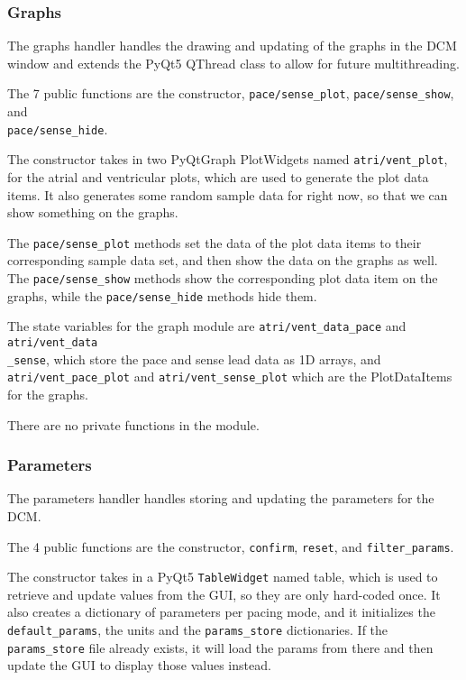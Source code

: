 \documentclass[12pt]{article}
\begin{document}
\subsubsection{Graphs}
The graphs handler handles the drawing and updating of the graphs in the DCM window and extends the PyQt5 QThread class to allow for future multithreading.

The 7 public functions are the constructor, \verb|pace/sense_plot|, \verb|pace/sense_show|, and \\ \verb|pace/sense_hide|.

The constructor takes in two PyQtGraph PlotWidgets named \verb|atri/vent_plot|, for the atrial and ventricular plots, which are used to generate the plot data items. It also generates some random sample data for right now, so that we can show something on the graphs.

The \verb|pace/sense_plot| methods set the data of the plot data items to their corresponding sample data set, and then show the data on the graphs as well. The \verb|pace/sense_show| methods show the corresponding plot data item on the graphs, while the \verb|pace/sense_hide| methods hide them. 

The state variables for the graph module are \verb|atri/vent_data_pace| and \verb|atri/vent_data|\\\verb|_sense|, which store the pace and sense lead data as 1D arrays, and \verb|atri/vent_pace_plot| and \verb|atri/vent_sense_plot| which are the PlotDataItems for the graphs.

There are no private functions in the module.

\subsubsection{Parameters}
The parameters handler handles storing and updating the parameters for the DCM.

The 4 public functions are the constructor, \verb|confirm|, \verb|reset|, and \verb|filter_params|.

The constructor takes in a PyQt5 \verb|TableWidget| named table, which is used to retrieve and update values from the GUI, so they are only hard-coded once.
It also creates a dictionary of parameters per pacing mode, and it initializes the \verb|default_params|, the units and the \verb|params_store| dictionaries.
If the \verb|params_store| file already exists, it will load the params from there and then update the GUI to display those values instead.
\end{document}
